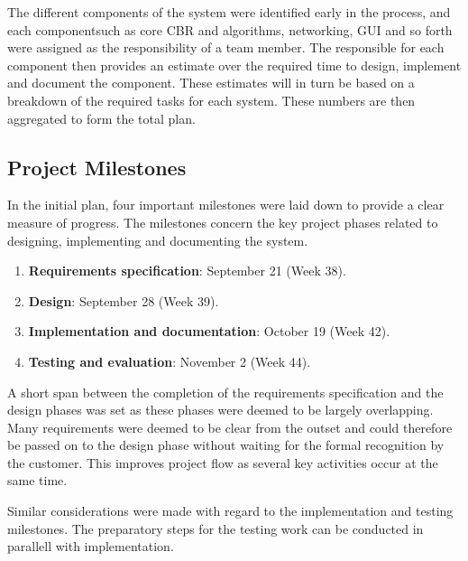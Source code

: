 The different components of the system were identified early in the process, and each componentsuch as core CBR and algorithms, networking, GUI and so forth were assigned as the responsibility of a team member. The responsible for each component then provides an estimate over the required time to design, implement and document the component. These estimates will in turn be based on a breakdown of the required tasks for each system. These numbers are then aggregated to form the total plan.

\subsection{Project Milestones}

In the initial plan, four important milestones were laid down to provide a clear measure of progress. The milestones concern the key project phases related to designing, implementing and documenting the system.

\begin{enumerate}
\item \textbf{Requirements specification}: September 21 (Week 38).
\item \textbf{Design}: September 28 (Week 39).
\item \textbf{Implementation and documentation}: October 19 (Week 42).
\item \textbf{Testing and evaluation}: November 2 (Week 44).
\end{enumerate}

A short span between the completion of the requirements specification and the design phases was set as these phases were deemed to be largely overlapping. Many requirements were deemed to be clear from the outset and could therefore be passed on to the design phase without waiting for the formal recognition by the customer. This improves project flow as several key activities occur at the same time.

Similar considerations were made with regard to the implementation and testing milestones. The preparatory steps for the testing work can be conducted in parallell with implementation.


